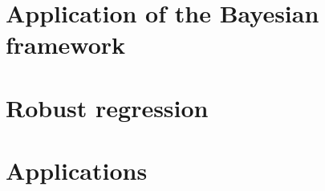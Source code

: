\documentclass[11pt, a4paper]{article}
\begin{document}
\section{Application of the Bayesian framework}

\section{Robust regression}

\section{Applications}

 
\end{document}
